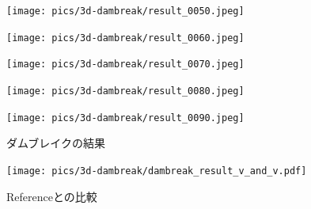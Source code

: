 \begin{figure}[H]
	\centering
	\begin{minipage}[b]{0.19\columnwidth}
	    \centering
	    \texttt{[image: pics/3d-dambreak/result\_0050.jpeg]}
	\end{minipage}
	\begin{minipage}[b]{0.19\columnwidth}
	    \centering
	    \texttt{[image: pics/3d-dambreak/result\_0060.jpeg]}
	\end{minipage}
	\begin{minipage}[b]{0.19\columnwidth}
	    \centering
	    \texttt{[image: pics/3d-dambreak/result\_0070.jpeg]}
	\end{minipage}
	\begin{minipage}[b]{0.19\columnwidth}
	    \centering
	    \texttt{[image: pics/3d-dambreak/result\_0080.jpeg]}
	\end{minipage}
	\begin{minipage}[b]{0.19\columnwidth}
	    \centering
	    \texttt{[image: pics/3d-dambreak/result\_0090.jpeg]}
	\end{minipage}

	\caption{ダムブレイクの結果}
	\label{fig:dambreak-result}
\end{figure}

\begin{figure}[H]
	\centering
	\texttt{[image: pics/3d-dambreak/dambreak\_result\_v\_and\_v.pdf]}
	\caption{Referenceとの比較\cite{Martin1952}}
	\label{fig:3d-dambreak-result-comparison}
\end{figure}

